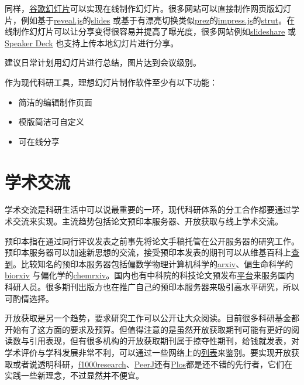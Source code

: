 \documentclass[]{tufte-book}
\providecommand{\tightlist}{%
  \setlength{\itemsep}{0pt}\setlength{\parskip}{0pt}}
\begin{document}
同样，\href{https://www.google.com/intl/zh-CN_us/slides/about/}{谷歌幻灯片}可以实现在线制作幻灯片。很多网站可以直接制作网页版幻灯片，例如基于\href{https://revealjs.com}{reveal.js}的\href{https://slides.com/}{slides} 或基于有漂亮切换类似\href{https://prezi.com/}{prez}的\href{https://impress.js.org/\#/source}{impress.js}的\href{http://strut.io}{strut}。在线制作幻灯片可以让分享变得很容易并提高了曝光度，很多网站例如\href{https://www.slideshare.net/}{slideshare} 或 \href{https://speakerdeck.com/}{Speaker Deck} 也支持上传本地幻灯片进行分享。

建议日常计划用幻灯片进行总结，图片达到会议级别。

作为现代科研工具，理想幻灯片制作软件至少有以下功能：

\begin{itemize}
\tightlist
\item
  简洁的编辑制作页面
\item
  模版简洁可自定义
\item
  可在线分享
\end{itemize}

\hypertarget{ux5b66ux672fux4ea4ux6d41}{%
\section*{学术交流}\label{ux5b66ux672fux4ea4ux6d41}}

学术交流是科研生活中可以说最重要的一环，现代科研体系的分工合作都要通过学术交流来实现。主流趋势包括论文预印本服务器、开放获取与线上学术交流。

预印本指在通过同行评议发表之前事先将论文手稿托管在公开服务器的研究工作。预印本服务器可以加速新思想的交流，接受预印本发表的期刊可以从维基百科上\href{https://en.wikipedia.org/wiki/List_of_academic_journals_by_preprint_policy}{查到}。比较知名的预印本服务器包括偏数学物理计算机科学的\href{https://arxiv.org/}{arxiv}、偏生命科学的\href{https://www.biorxiv.org/}{biorxiv} 与偏化学的\href{https://chemrxiv.org/}{chemrxiv}。国内也有中科院的科技论文预发布\href{http://chinaxiv.org/home.htm}{平台}来服务国内科研人员。很多期刊出版方也在推广自己的预印本服务器来吸引高水平研究，所以可酌情选择。

开放获取是另一个趋势，要求研究工作可以公开让大众阅读。目前很多科研基金都开始有了这方面的要求及预算。但值得注意的是虽然开放获取期刊可能有更好的阅读数与引用表现，但有很多机构的开放获取期刊属于掠夺性期刊，给钱就发表，对学术评价与学科发展非常不利，可以通过一些网络上的\href{https://beallslist.weebly.com/}{列表}来鉴别。要实现开放获取或者说透明科研，\href{https://f1000research.com/}{f1000research}、\href{https://peerj.org/}{PeerJ}还有\href{https://www.plos.org/}{Plos}都是还不错的先行者，它们在实践一些新理念，不过显然并不便宜。
\end{document}
